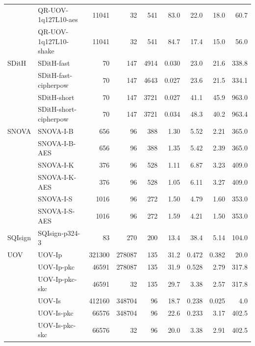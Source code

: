 \begin{table}[t]
\begin{tabular}{llrrrrrrr}
 & QR-UOV-1q127L10-aes & 11041 & 32 & 541 & 83.0 & 22.0 & 18.0 & 60.7 \\
 & QR-UOV-1q127L10-shake & 11041 & 32 & 541 & 84.7 & 17.4 & 15.0 & 56.0 \\
\midrule
SDitH & SDitH-fast & 70 & 147 & 4914 & 0.030 & 23.0 & 21.6 & 338.8 \\
 & SDitH-fast-cipherpow & 70 & 147 & 4643 & 0.027 & 23.6 & 21.5 & 334.1 \\
 & SDitH-short & 70 & 147 & 3721 & 0.027 & 41.1 & 45.9 & 963.0 \\
 & SDitH-short-cipherpow & 70 & 147 & 3721 & 0.034 & 48.3 & 40.2 & 963.4 \\
\midrule
SNOVA & SNOVA-I-B & 656 & 96 & 388 & 1.30 & 5.52 & 2.21 & 365.0 \\
 & SNOVA-I-B-AES & 656 & 96 & 388 & 1.35 & 5.42 & 2.39 & 365.0 \\
 & SNOVA-I-K & 376 & 96 & 528 & 1.11 & 6.87 & 3.23 & 409.0 \\
 & SNOVA-I-K-AES & 376 & 96 & 528 & 1.05 & 6.11 & 3.27 & 409.0 \\
 & SNOVA-I-S & 1016 & 96 & 272 & 1.50 & 4.79 & 1.60 & 353.0 \\
 & SNOVA-I-S-AES & 1016 & 96 & 272 & 1.59 & 4.21 & 1.50 & 353.0 \\
\midrule
SQIsign & SQIsign-p324-3 & 83 & 270 & 200 & 13.4 & 38.4 & 5.14 & 104.0 \\
\midrule
UOV & UOV-Ip & 321300 & 278087 & 135 & 31.2 & 0.472 & 0.382 & 20.0 \\
 & UOV-Ip-pkc & 46591 & 278087 & 135 & 31.9 & 0.528 & 2.79 & 317.8 \\
 & UOV-Ip-pkc-skc & 46591 & 32 & 135 & 29.7 & 3.38 & 2.57 & 317.8 \\
 & UOV-Is & 412160 & 348704 & 96 & 18.7 & 0.238 & 0.025 & 4.0 \\
 & UOV-Is-pkc & 66576 & 348704 & 96 & 22.6 & 0.233 & 3.17 & 402.5 \\
 & UOV-Is-pkc-skc & 66576 & 32 & 96 & 20.0 & 3.38 & 2.91 & 402.5 \\
\bottomrule
\end{tabular}
\end{table}
